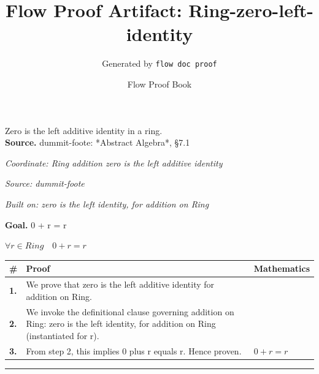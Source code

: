 \documentclass[11pt]{article}
\title{Flow Proof Artifact: Ring-zero-left-identity}
\author{Generated by \texttt{flow doc proof}}
\date{Flow Proof Book}
\theoremstyle{definition}
\begin{document}
\maketitle
Zero is the left additive identity in a ring.\\[0.5em]
\textbf{Source.} dummit-foote: *Abstract Algebra*, §7.1\\[0.5em]
\bigskip
{}\par
\smallskip\noindent\textit{Coordinate: Ring \cdot addition \cdot zero is the left additive identity}\par
\smallskip\noindent\textit{Source: dummit-foote}\par
\smallskip\noindent\textit{Built on: zero is the left identity, for addition on Ring}\par
\medskip
\noindent\textbf{Goal.} 0 + r = r\par
\noindent$\displaystyle \forall r \in Ring\quad 0 + r = r$\par
\medskip
\noindent
\begin{tabular}{@{} >{\raggedright\arraybackslash}p{} >{\raggedright\arraybackslash}p{} >{\raggedleft\arraybackslash}p{} @{}}
\textbf{\#} & \textbf{Proof} & \textbf{Mathematics} \\
\midrule
\textbf{1.} & We prove that zero is the left additive identity for addition on Ring. & \\[0.45em]
\textbf{2.} & We invoke the definitional clause governing addition on Ring: zero is the left identity, for addition on Ring (instantiated for r). & \\[0.45em]
\textbf{3.} & From step 2, this implies 0 plus r equals r. Hence proven. & $\displaystyle 0 + r = r$ \\[0.45em]
\bottomrule
\end{tabular}
\label{thm:Ring-addition-zero_is_the_left_additive_identity}
\par\medskip\hrule
\end{document}
